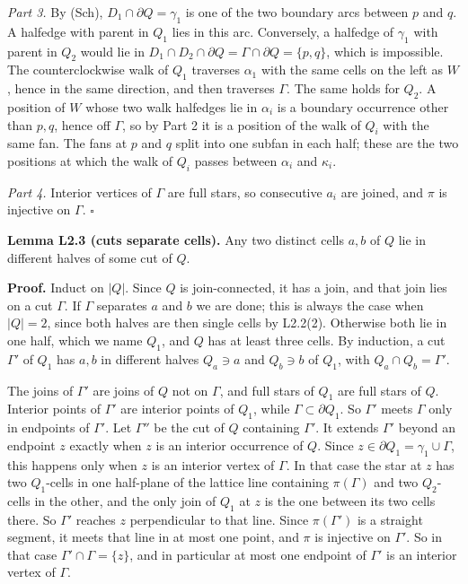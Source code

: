 \documentclass[
  11pt,
]{article}
\begin{document}
\emph{Part 3.} By (Sch), \(D_1\cap\partial Q=\gamma_1\) is one of the
two boundary arcs between \(p\) and \(q\). A halfedge with parent in
\(Q_1\) lies in this arc. Conversely, a halfedge of \(\gamma_1\) with
parent in \(Q_2\) would lie in
\(D_1\cap D_2\cap\partial Q=\Gamma\cap\partial Q=\{p,q\}\), which is
impossible. The counterclockwise walk of \(Q_1\) traverses \(\alpha_1\)
with the same cells on the left as \(W\), hence in the same direction,
and then traverses \(\Gamma\). The same holds for \(Q_2\). A position of
\(W\) whose two walk halfedges lie in \(\alpha_i\) is a boundary
occurrence other than \(p,q\), hence off \(\Gamma\), so by Part 2 it is
a position of the walk of \(Q_i\) with the same fan. The fans at \(p\)
and \(q\) split into one subfan in each half; these are the two
positions at which the walk of \(Q_i\) passes between \(\alpha_i\) and
\(\kappa_i\).

\emph{Part 4.} Interior vertices of \(\Gamma\) are full stars, so
consecutive \(a_i\) are joined, and \(\pi\) is injective on \(\Gamma\).
\(\square\)

\textbf{Lemma L2.3 (cuts separate cells).} Any two distinct cells
\(a,b\) of \(Q\) lie in different halves of some cut of \(Q\).

\textbf{Proof.} Induct on \(|Q|\). Since \(Q\) is join-connected, it has
a join, and that join lies on a cut \(\Gamma\). If \(\Gamma\) separates
\(a\) and \(b\) we are done; this is always the case when \(|Q|=2\),
since both halves are then single cells by L2.2(2). Otherwise both lie
in one half, which we name \(Q_1\), and \(Q\) has at least three cells.
By induction, a cut \(\Gamma'\) of \(Q_1\) has \(a,b\) in different
halves \(Q_a\ni a\) and \(Q_b\ni b\) of \(Q_1\), with
\(Q_a\cap Q_b=\Gamma'\).

The joins of \(\Gamma'\) are joins of \(Q\) not on \(\Gamma\), and full
stars of \(Q_1\) are full stars of \(Q\). Interior points of \(\Gamma'\)
are interior points of \(Q_1\), while \(\Gamma\subset\partial Q_1\). So
\(\Gamma'\) meets \(\Gamma\) only in endpoints of \(\Gamma'\). Let
\(\Gamma''\) be the cut of \(Q\) containing \(\Gamma'\). It extends
\(\Gamma'\) beyond an endpoint \(z\) exactly when \(z\) is an interior
occurrence of \(Q\). Since \(z\in\partial Q_1=\gamma_1\cup \Gamma\),
this happens only when \(z\) is an interior vertex of \(\Gamma\). In
that case the star at \(z\) has two \(Q_1\)-cells in one half-plane of
the lattice line containing \(\pi(\Gamma)\) and two \(Q_2\)-cells in the
other, and the only join of \(Q_1\) at \(z\) is the one between its two
cells there. So \(\Gamma'\) reaches \(z\) perpendicular to that line.
Since \(\pi(\Gamma')\) is a straight segment, it meets that line in at
most one point, and \(\pi\) is injective on \(\Gamma'\). So in that case
\(\Gamma'\cap\Gamma=\{z\}\), and in particular at most one endpoint of
\(\Gamma'\) is an interior vertex of \(\Gamma\).
\end{document}
